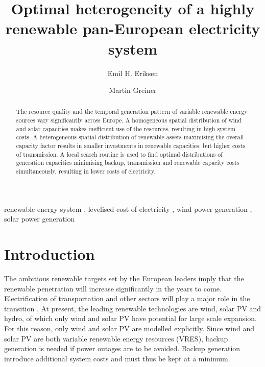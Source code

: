 \documentclass[a4paper, 5p, sort&compress]{elsarticle}%
\begin{document}

\begin{frontmatter}

\title{Optimal heterogeneity of a highly renewable pan-European electricity system}

\author[label1]{Emil H. Eriksen}
\author[label2]{Martin Greiner}
\address[label1]{Department of Physics and Astronomy, Aarhus University, 8000 Aarhus C,  Denmark}
\address[label2]{Department of Engineering, Aarhus University, 8200 Aarhus,  Denmark}


\begin{abstract}
  The resource quality and the temporal generation pattern of variable
  renewable energy sources vary significantly across Europe. A
  homogeneous spatial distribution of wind and solar capacities makes
  inefficient use of the resources, resulting in high system costs. A
  heterogeneous spatial distribution of renewable assets maximising the
  overall capacity factor results in smaller investments in renewable
  capacities, but higher costs of transmission. A local search routine
  is used to find optimal distributions of generation capacities
  minimising backup, transmission and renewable capacity costs
  simultaneously, resulting in lower costs of electricity.
\end{abstract}

\begin{keyword}
renewable energy system \sep 
levelised cost of electricity \sep
wind power generation \sep
solar power generation 
\end{keyword}

\end{frontmatter}


\section{Introduction}
\label{sec:one}

The ambitious renewable targets set by the European leaders
\cite{eu2050} imply that the renewable penetration will increase
significantly in the years to come. Electrification of transportation
and other sectors will play a major role in the transition
\cite{Williams12,ecf2050}. At present, the leading renewable
technologies are wind, solar PV and hydro, of which only wind and
solar PV have potential for large scale expansion. For this reason,
only wind and solar PV are modelled explicitly. Since wind and
solar PV are both variable renewable energy resources (VRES), backup
generation is needed if power outages are to be avoided. Backup
generation introduce additional system costs and must thus be kept at a
minimum.
\end{document}
